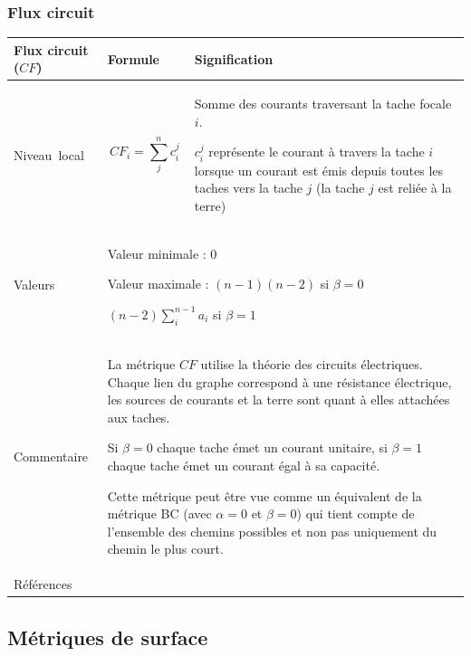 \documentclass{article}
\begin{document}
\subsubsection{Flux circuit}
\label{metric_CF}
\begin{table}[H]
	\begin{tabular}{|m{3.24cm}|m{4.4810004cm}m{7.924cm}|}
		\hline
		Flux circuit ($CF$) &
		\multicolumn{1}{m{4.4810004cm}|}{Formule} &
		Signification\\\hline
		Niveau~local &
		\multicolumn{1}{m{4.4810004cm}|}{
			\begin{equation*}
			CF_{i}=\sum_{j}^n{c_i^j}
			\end{equation*}
		} &
		Somme des courants traversant la tache focale $i$.
		
		$c_i^j$ représente le courant à travers la tache $i$ lorsque un courant est émis depuis toutes les taches vers la tache $j$ (la tache $j$ est reliée à la terre)
		
		\\\hline
		Valeurs &
		\multicolumn{2}{m{12.6050005cm}|}{			
			Valeur minimale : 0
			
			Valeur maximale : $(n-1)(n-2)$ si $\beta=0$
			
			$(n-2)\sum_i^{n-1} a_i$ si $\beta=1$
			
		}\\\hline
		Commentaire &
		\multicolumn{2}{m{12.6050005cm}|}{
			La métrique $CF$ utilise la théorie des circuits électriques. Chaque lien du graphe correspond à une résistance électrique, les sources de courants et la terre sont quant à elles attachées aux taches.
			
			Si $\beta=0$ chaque tache émet un courant unitaire, si $\beta=1$ chaque tache émet un courant égal à sa capacité.
			
			Cette métrique peut être vue comme un équivalent de la métrique BC (avec $\alpha=0$ et $\beta=0$) qui tient compte de l'ensemble des chemins possibles et non pas uniquement du chemin le plus court.
			
		}\\\hline
		Références &
		\multicolumn{2}{m{12.6050005cm}|}{		
			\cite{2015_collisions}
		}\\\hline
	\end{tabular}
\end{table}


\subsection{Métriques de surface}
\end{document}
